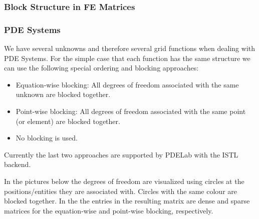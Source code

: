 \subsubsection{Block Structure in FE Matrices}
\label{sec:motivation}
\begin{frame} \frametitle{PDE Systems}
  \begin{block}{}
      We have several unknowns and therefore several grid functions
      when dealing with PDE Systems.
      For the simple case that each function has the same structure we
      can use the following special ordering and blocking approaches:
  \begin{itemize}
  \item Equation-wise blocking: All degrees of freedom associated with
    the same unknown are blocked together.
  \item Point-wise blocking: All degrees of freedom associated with
    the same point (or element) are blocked together.
  \item No blocking is used.
  \end{itemize}
  \end{block}
  Currently the last two approaches are supported by PDELab with the
  ISTL backend.
\end{frame}
In the pictures below the degrees of freedom are visualized using
circles at the positions/entities they are associated with. Circles
with the same colour are blocked together. In the the entries in the
resulting matrix are dense and sparse matrices for the equation-wise
and point-wise blocking, respectively.
